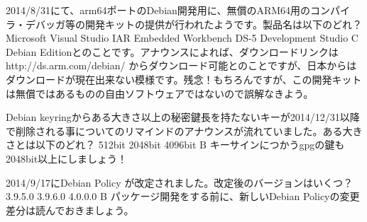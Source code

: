 \santaku
{2014/8/31にて、arm64ポートのDebian開発用に、無償のARM64用のコンパイラ・デバッガ等の開発キットの提供が行われたようです。製品名は以下のどれ？}
{Microsoft Visual Studio}
{IAR Embedded Workbench}
{DS-5 Development Studio}
{C}
{ Debian Editionとのことです。アナウンスによれば、ダウンロードリンクは http://ds.arm.com/debian/ からダウンロード可能とのことですが、日本からはダウンロードが現在出来ない模様です。残念！もちろんですが、この開発キットは無償ではあるものの自由ソフトウェアではないので誤解なきよう。}

\santaku
{ Debian keyringからある大きさ以上の秘密鍵長を持たないキーが2014/12/31以降で削除される事についてのリマインドのアナウンスが流れていました。ある大きさとは以下のどれ？}
{ 512bit }
{ 2048bit }
{ 4096bit }
{B}
{ キーサインにつかうgpgの鍵も2048bit以上にしましょう！}

\santaku
{ 2014/9/17にDebian Policy が改定されました。改定後のバージョンはいくつ？}
{ 3.9.5.0 }
{ 3.9.6.0 }
{ 4.0.0.0 }
{B} 
{ パッケージ開発をする前に、新しいDebian Policyの変更差分は読んでおきましょう。}



